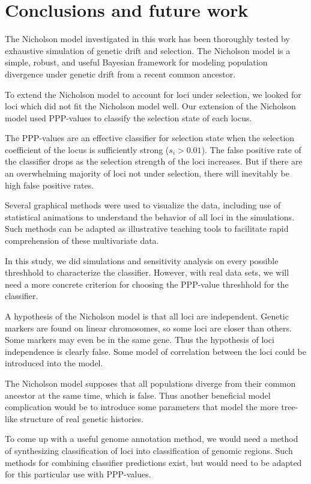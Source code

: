 \documentclass[a4paper,12pt]{article}
\begin{document}
\section{Conclusions and future work}

The Nicholson model investigated in this work has been thoroughly
tested by exhaustive simulation of genetic drift and selection. The
Nicholson model is a simple, robust, and useful Bayesian framework for
modeling population divergence under genetic drift from a recent
common ancestor.

To extend the Nicholson model to account for loci under selection, we
looked for loci which did not fit the Nicholson model well. Our
extension of the Nicholson model used PPP-values to classify the
selection state of each locus.

The PPP-values are an effective classifier for selection state when
the selection coefficient of the locus is sufficiently strong
($s_i>0.01$). The false positive rate of the classifier drops as the
selection strength of the loci increases. But if there are an
overwhelming majority of loci not under selection, there will
inevitably be high false positive rates.

Several graphical methods were used to visualize the data, including
use of statistical animations to understand the behavior of all loci
in the simulations. Such methods can be adapted as illustrative
teaching tools to facilitate rapid comprehension of these multivariate
data.

In this study, we did simulations and sensitivity analysis on every
possible threshhold to characterize the classifier. However, with real
data sets, we will need a more concrete criterion for choosing the
PPP-value threshhold for the classifier.

A hypothesis of the Nicholson model is that all loci are
independent. Genetic markers are found on linear chromosomes, so some
loci are closer than others. Some markers may even be in the same
gene. Thus the hypothesis of loci independence is clearly false. Some
model of correlation between the loci could be introduced into the
model.

The Nicholson model supposes that all populations diverge from their
common ancestor at the same time, which is false. Thus another
beneficial model complication would be to introduce some parameters
that model the more tree-like structure of real genetic histories.

To come up with a useful genome annotation method, we would need a
method of synthesizing classification of loci into classification of
genomic regions. Such methods for combining classifier predictions
exist, but would need to be adapted for this particular use with
PPP-values.
\end{document}

